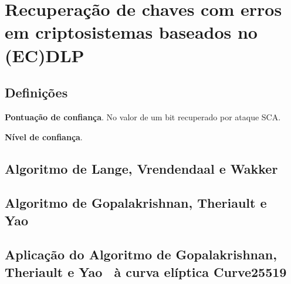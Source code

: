 
\section{Recuperação de chaves com erros em criptosistemas baseados no (EC)DLP}

\subsection{Definições}

\noindent \textbf{Pontuação de confiança}. No valor de um bit recuperado por ataque SCA.

\noindent \textbf{Nível de confiança}.

\subsection{Algoritmo de Lange, Vrendendaal e Wakker~\cite{LangeVredendaalWakker2014}}


\subsection{Algoritmo de Gopalakrishnan, Theriault e Yao~\cite{GopalakrishnanTheriaultYao07}}


\subsection{Aplicação do Algoritmo de Gopalakrishnan, Theriault e Yao~\cite{GopalakrishnanTheriaultYao07} à curva elíptica Curve25519}



